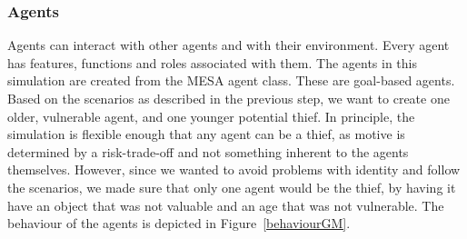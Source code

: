 \documentclass[12pt]{article}
\begin{document}
\subsubsection{Agents} 


Agents can interact with other agents and with their environment. Every agent has features, functions and roles associated with them. The agents in this simulation are created from the MESA agent class. These are goal-based agents.
Based on the scenarios as described in the previous step, we want to create one older, vulnerable agent, and one younger potential thief. In principle, the simulation is flexible enough that any agent can be a thief, as motive is determined by a risk-trade-off and not something inherent to the agents themselves. However, since we wanted to avoid problems with identity and follow the scenarios, we made sure that only one agent would be the thief, by having it have an object that was not valuable and an age that was not vulnerable. The behaviour of the agents is depicted in Figure~\ref{behaviourGM}.
\end{document}
